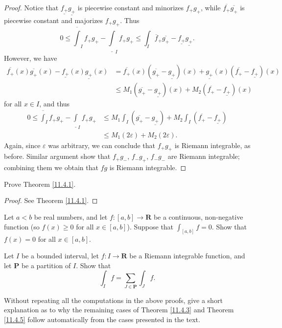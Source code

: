 \begin{proof}
    Notice that \(\underline{f_+} \underline{g_+}\) is piecewise constant and minorizes \(f_+ g_+\), while \(\overline{f_+} \overline{g_+}\) is piecewise constant and majorizes \(f_+ g_+\).
    Thus
    \[
        0 \leq \overline{\int}_I f_+ g_+ - \underline{\int}_I f_+ g_+ \leq \int_I \overline{f}_+ \overline{g_+} - \underline{f_+} \underline{g_+}.
    \]
    However, we have
    \begin{align*}
        \overline{f_+}(x) \overline{g_+}(x) - \underline{f_+}(x) \underline{g_+}(x) & = \overline{f_+}(x) (\overline{g_+} - \underline{g_+})(x) + \underline{g_+}(x) (\overline{f_+} - \underline{f_+})(x) \\
                                                                                    & \leq M_1 (\overline{g_+} - \underline{g_+})(x) + M_2 (\overline{f_+} - \underline{f_+})(x)
    \end{align*}
    for all \(x \in I\), and thus
    \begin{align*}
        0 \leq \overline{\int}_I f_+ g_+ - \underline{\int}_I f_+ g_+ & \leq M_1 \int_I (\overline{g_+} - \underline{g_+}) + M_2 \int_I (\overline{f_+} - \underline{f_+}) \\
                                                                      & \leq M_1 (2\varepsilon) + M_2 (2\varepsilon).
    \end{align*}
    Again, since \(\varepsilon\) was arbitrary, we can conclude that \(f_+ g_+\) is Riemann integrable, as before.
    Similar argument show that \(f_+ g_-\), \(f_- g_+\), \(f_- g_-\) are Riemann integrable;
    combining them we obtain that \(fg\) is Riemann integrable.
\end{proof}

\exercisesection

\begin{exercise}\label{ex 11.4.1}
    Prove Theorem \ref{11.4.1}.
\end{exercise}

\begin{proof}
    See Theorem \ref{11.4.1}.
\end{proof}

\begin{exercise}\label{ex 11.4.2}
    Let \(a < b\) be real numbers, and let \(f : [a, b] \to \mathbf{R}\) be a continuous, non-negative function
    (so \(f(x) \geq 0\) for all \(x \in [a, b]\)).
    Suppose that \(\int_[a, b] f = 0\).
    Show that \(f(x) = 0\) for all \(x \in [a, b]\).
\end{exercise}

\begin{exercise}\label{ex 11.4.3}
    Let \(I\) be a bounded interval, let \(f : I \to \mathbf{R}\) be a Riemann integrable function, and let \(\mathbf{P}\) be a partition of \(I\).
    Show that
    \[
        \int_I f = \sum_{J \in \mathbf{P}} \int_J f.
    \]
\end{exercise}

\begin{exercise}\label{ex 11.4.4}
    Without repeating all the computations in the above proofs, give a short explanation as to why the remaining cases of Theorem \ref{11.4.3} and Theorem \ref{11.4.5} follow automatically from the cases presented in the text.
\end{exercise}